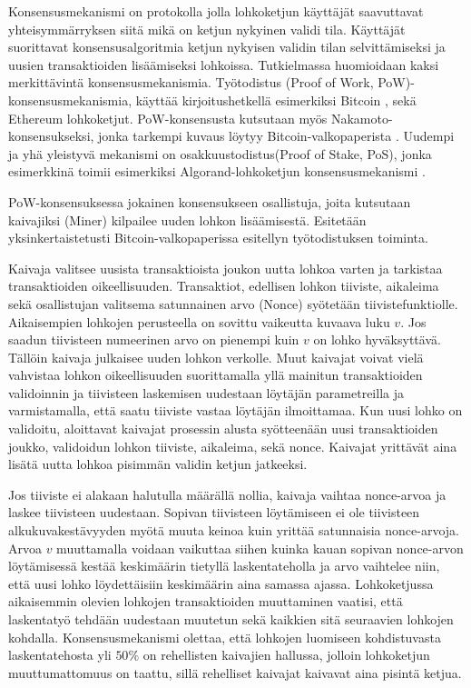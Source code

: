 Konsensusmekanismi on protokolla jolla lohkoketjun käyttäjät saavuttavat yhteisymmärryksen siitä mikä on ketjun nykyinen validi tila. Käyttäjät suorittavat konsensusalgoritmia ketjun nykyisen validin tilan selvittämiseksi ja uusien transaktioiden lisäämiseksi lohkoissa. Tutkielmassa huomioidaan kaksi merkittävintä konsensusmekanismia. Työtodistus (Proof of Work, PoW)-konsensusmekanismia, käyttää kirjoitushetkellä esimerkiksi Bitcoin \cite{Nakamoto_bitcoin}, sekä Ethereum \cite{buterin_ethereum_2014} lohkoketjut. PoW-konsensusta kutsutaan myös Nakamoto-konsensukseksi, jonka tarkempi kuvaus löytyy Bitcoin-valkopaperista \cite{Nakamoto_bitcoin}. Uudempi ja yhä yleistyvä mekanismi on osakkuustodistus(Proof of Stake, PoS), jonka esimerkkinä toimii esimerkiksi Algorand-lohkoketjun konsensusmekanismi \cite{gilad_algorand_2017}. 

PoW-konsensuksessa jokainen konsensukseen osallistuja, joita kutsutaan kaivajiksi (Miner) kilpailee uuden lohkon lisäämisestä. Esitetään yksinkertaistetusti Bitcoin-valkopaperissa \cite{Nakamoto_bitcoin} esitellyn työtodistuksen toiminta.

Kaivaja valitsee uusista transaktioista joukon uutta lohkoa varten ja tarkistaa transaktioiden oikeellisuuden. Transaktiot, edellisen lohkon tiiviste, aikaleima sekä osallistujan valitsema satunnainen arvo (Nonce) syötetään tiivistefunktiolle. Aikaisempien lohkojen perusteella on sovittu vaikeutta kuvaava luku $v$. Jos saadun tiivisteen numeerinen arvo on pienempi kuin $v$ on lohko hyväksyttävä. Tällöin kaivaja julkaisee uuden lohkon verkolle. Muut kaivajat voivat vielä vahvistaa lohkon oikeellisuuden suorittamalla yllä mainitun transaktioiden validoinnin ja tiivisteen laskemisen uudestaan löytäjän parametreilla ja varmistamalla, että saatu tiiviste vastaa löytäjän ilmoittamaa. Kun uusi lohko on validoitu, aloittavat kaivajat prosessin alusta syötteenään uusi transaktioiden joukko, validoidun lohkon tiiviste, aikaleima, sekä nonce. Kaivajat yrittävät aina lisätä uutta lohkoa pisimmän validin ketjun jatkeeksi. 

Jos tiiviste ei alakaan halutulla määrällä nollia, kaivaja vaihtaa nonce-arvoa ja laskee tiivisteen uudestaan. Sopivan tiivisteen löytämiseen ei ole tiivisteen alkukuvakestävyyden myötä muuta keinoa kuin yrittää satunnaisia nonce-arvoja. Arvoa $v$ muuttamalla voidaan vaikuttaa siihen kuinka kauan sopivan nonce-arvon löytämisessä kestää keskimäärin tietyllä laskentateholla ja arvo vaihtelee niin, että uusi lohko löydettäisiin keskimäärin aina samassa ajassa. Lohkoketjussa aikaisemmin olevien lohkojen transaktioiden muuttaminen vaatisi, että laskentatyö tehdään uudestaan muutetun sekä kaikkien sitä seuraavien lohkojen kohdalla. Konsensusmekanismi olettaa, että lohkojen luomiseen kohdistuvasta laskentatehosta yli $50\%$ on rehellisten kaivajien hallussa, jolloin lohkoketjun muuttumattomuus on taattu, sillä rehelliset kaivajat kaivavat aina pisintä ketjua.

